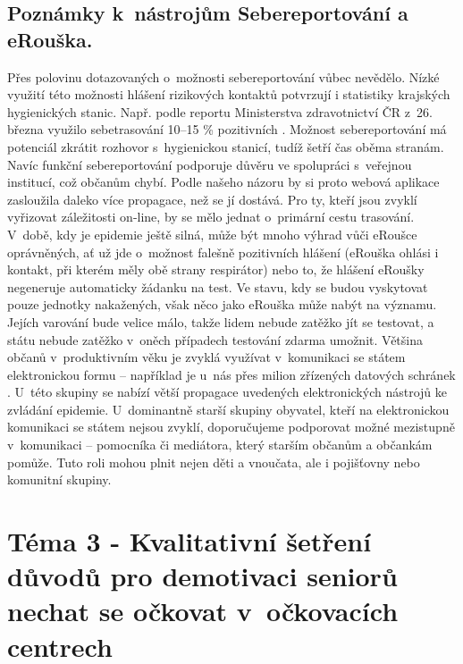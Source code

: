 \subsection*{Poznámky k~nástrojům Sebereportování a eRouška.}
Přes polovinu dotazovaných o~možnosti sebereportování vůbec nevědělo. Nízké využití této možnosti hlášení rizikových kontaktů potvrzují i statistiky krajských hygienických stanic. Např. podle reportu Ministerstva zdravotnictví ČR z~26. března využilo sebetrasování 10–15 \% pozitivních \cite{MinisterstvoZdravotnictviCR2021}. Možnost sebereportování má potenciál zkrátit rozhovor s~hygienickou stanicí, tudíž šetří čas oběma stranám. Navíc funkční sebereportování podporuje důvěru ve spolupráci s~veřejnou institucí, což občanům chybí. Podle našeho názoru by si proto webová aplikace zasloužila daleko více propagace, než se jí dostává. Pro ty, kteří jsou zvyklí vyřizovat záležitosti on-line, by se mělo jednat o~primární cestu trasování. 
V~době, kdy je epidemie ještě silná, může být mnoho výhrad vůči eRoušce oprávněných, ať už jde o~možnost falešně pozitivních hlášení (eRouška ohlási i kontakt, při kterém měly obě strany respirátor) nebo to, že hlášení eRoušky negeneruje automaticky žádanku na test. Ve stavu, kdy se budou vyskytovat pouze jednotky nakažených, však něco jako eRouška může nabýt na významu. Jejích varování bude velice málo, takže lidem nebude zatěžko jít se testovat, a státu nebude zatěžko v~oněch případech testování zdarma umožnit. 
Většina občanů v~produktivním věku je zvyklá využívat v~komunikaci se státem elektronickou formu – například je u~nás přes milion zřízených datových schránek \cite{DatoveSchranky2021}. U~této skupiny se nabízí větší propagace uvedených elektronických nástrojů ke zvládání epidemie. U~dominantně starší skupiny obyvatel, kteří na elektronickou komunikaci se státem nejsou zvyklí, doporučujeme podporovat možné mezistupně v~komunikaci – pomocníka či mediátora, který starším občanům a občankám pomůže. Tuto roli mohou plnit nejen děti a vnoučata, ale i pojišťovny nebo komunitní skupiny. 

\section*{Téma 3 - Kvalitativní šetření důvodů pro demotivaci seniorů nechat se očkovat v~očkovacích centrech}

